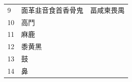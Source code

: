 \begin{longtable}[]{@{}lll@{}}
\begin{minipage}[t]{0.30\columnwidth}
9\strut
\end{minipage} & \begin{minipage}[t]{0.30\columnwidth}\raggedright
面革韭音食首香骨鬼\strut
\end{minipage} & \begin{minipage}[t]{0.30\columnwidth}\raggedright
畐咸柬畏禺\strut
\end{minipage}\tabularnewline
\begin{minipage}[t]{0.30\columnwidth}\raggedright
10\strut
\end{minipage} & \begin{minipage}[t]{0.30\columnwidth}\raggedright
高鬥\strut
\end{minipage} & \begin{minipage}[t]{0.30\columnwidth}\raggedright
\strut
\end{minipage}\tabularnewline
\begin{minipage}[t]{0.30\columnwidth}\raggedright
11\strut
\end{minipage} & \begin{minipage}[t]{0.30\columnwidth}\raggedright
麻鹿\strut
\end{minipage} & \begin{minipage}[t]{0.30\columnwidth}\raggedright
\strut
\end{minipage}\tabularnewline
\begin{minipage}[t]{0.30\columnwidth}\raggedright
12\strut
\end{minipage} & \begin{minipage}[t]{0.30\columnwidth}\raggedright
黍黄黑\strut
\end{minipage} & \begin{minipage}[t]{0.30\columnwidth}\raggedright
\strut
\end{minipage}\tabularnewline
\begin{minipage}[t]{0.30\columnwidth}\raggedright
13\strut
\end{minipage} & \begin{minipage}[t]{0.30\columnwidth}\raggedright
鼓\strut
\end{minipage} & \begin{minipage}[t]{0.30\columnwidth}\raggedright
\strut
\end{minipage}\tabularnewline
\begin{minipage}[t]{0.30\columnwidth}\raggedright
14\strut
\end{minipage} & \begin{minipage}[t]{0.30\columnwidth}\raggedright
鼻\strut
\end{minipage} & \begin{minipage}[t]{0.30\columnwidth}\raggedright
\strut
\end{minipage}\tabularnewline
\bottomrule
\end{longtable}

